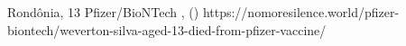           {Rondônia, }
          {13}
          {Pfizer/BioNTech}
          {}
          {
            ,
             ()
          }
          {https://nomoresilence.world/pfizer-biontech/weverton-silva-aged-13-died-from-pfizer-vaccine/}
